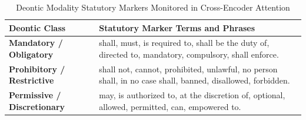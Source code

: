 \begin{table}[htbp]
    \centering
    \footnotesize
    \setlength{\tabcolsep}{4.0pt}
    \renewcommand{\arraystretch}{0.95}
    \caption[Deontic Modality Statutory Markers]{Deontic Modality Statutory Markers Monitored in Cross-Encoder Attention}
    \label{tab:app_deontic_markers}
    \begin{tabularx}{\linewidth}{>{\bfseries}p{3.5cm}>{\RaggedRight\arraybackslash}X}
        \toprule
        \textbf{Deontic Class} & \textbf{Statutory Marker Terms and Phrases} \\
        \midrule
        Mandatory / Obligatory & shall, must, is required to, shall be the duty of, directed to, mandatory, compulsory, shall enforce. \\
        \addlinespace[3pt]
        Prohibitory / Restrictive & shall not, cannot, prohibited, unlawful, no person shall, in no case shall, banned, disallowed, forbidden. \\
        \addlinespace[3pt]
        Permissive / Discretionary & may, is authorized to, at the discretion of, optional, allowed, permitted, can, empowered to. \\
        \bottomrule
    \end{tabularx}
\end{table}


